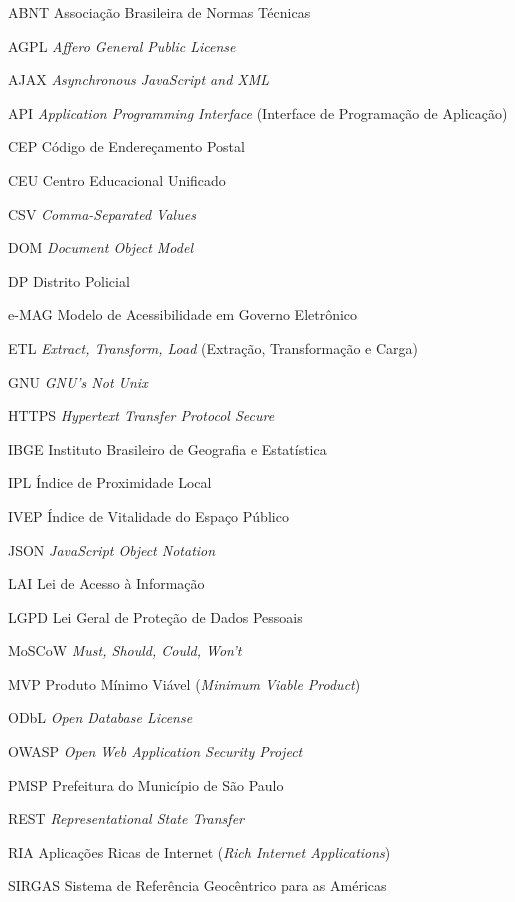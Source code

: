 \documentclass[
    12pt,
    oneside,            %
    a4paper,
    brazilian
    ]{abntex2}
\begin{document}
\begin{siglas}
  \item[ABNT] Associação Brasileira de Normas Técnicas
  \item[AGPL] \textit{Affero General Public License}
  \item[AJAX] \textit{Asynchronous JavaScript and XML}
  \item[API] \textit{Application Programming Interface} (Interface de Programação de Aplicação)
  \item[CEP] Código de Endereçamento Postal
  \item[CEU] Centro Educacional Unificado
  \item[CSV] \textit{Comma-Separated Values}
  \item[DOM] \textit{Document Object Model}
  \item[DP] Distrito Policial
  \item[e-MAG] Modelo de Acessibilidade em Governo Eletrônico
  \item[ETL] \textit{Extract, Transform, Load} (Extração, Transformação e Carga)
  \item[GNU] \textit{GNU's Not Unix}
  \item[HTTPS] \textit{Hypertext Transfer Protocol Secure}
  \item[IBGE] Instituto Brasileiro de Geografia e Estatística
  \item[IPL] Índice de Proximidade Local
  \item[IVEP] Índice de Vitalidade do Espaço Público
  \item[JSON] \textit{JavaScript Object Notation}
  \item[LAI] Lei de Acesso à Informação
  \item[LGPD] Lei Geral de Proteção de Dados Pessoais
  \item[MoSCoW] \textit{Must, Should, Could, Won't}
  \item[MVP] Produto Mínimo Viável (\textit{Minimum Viable Product})
  \item[ODbL] \textit{Open Database License}
  \item[OWASP] \textit{Open Web Application Security Project}
  \item[PMSP] Prefeitura do Município de São Paulo
  \item[REST] \textit{Representational State Transfer}
  \item[RIA] Aplicações Ricas de Internet (\textit{Rich Internet Applications})
  \item[SIRGAS] Sistema de Referência Geocêntrico para as Américas

\end{siglas}
\end{document}
